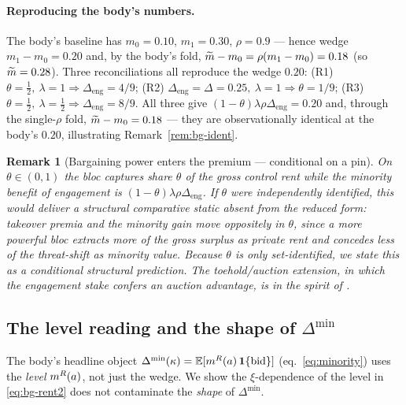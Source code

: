 \documentclass[11pt]{article}
\newcommand{\E}{\mathbb{E}}
\newcommand{\1}{\mathbf{1}}
\newtheorem{remark}{Remark}
\begin{document}
\paragraph{Reproducing the body's numbers.}
The body's baseline has $m_{0}=0.10$, $m_{1}=0.30$, $\rho=0.9$ --- hence wedge $m_{1}-m_{0}=0.20$ and, by the body's fold, $\widetilde{m}-m_{0}=\rho(m_{1}-m_{0})=0.18$ (so $\widetilde{m}=0.28$). Three reconciliations all reproduce the wedge $0.20$: (R1) $\theta=\tfrac12,\ \lambda=1\Rightarrow\Delta_{\mathrm{eng}}=4/9$; (R2) $\Delta_{\mathrm{eng}}=\Delta=0.25,\ \lambda=1\Rightarrow\theta=1/9$; (R3) $\theta=\tfrac12,\ \lambda=\tfrac12\Rightarrow\Delta_{\mathrm{eng}}=8/9$. All three give $(1-\theta)\lambda\rho\Delta_{\mathrm{eng}}=0.20$ and, through the single-$\rho$ fold, $\widetilde{m}-m_{0}=0.18$ --- they are observationally identical at the body's $0.20$, illustrating Remark~\ref{rem:bg-ident}.

\begin{remark}[Bargaining power enters the premium --- conditional on a pin]
\label{rem:bg-thetadomain}
On $\theta\in(0,1)$ the bloc captures share $\theta$ of the gross control rent while the minority benefit of engagement is $(1-\theta)\lambda\rho\Delta_{\mathrm{eng}}$. \emph{If $\theta$ were independently identified}, this would deliver a structural comparative static absent from the reduced form: takeover premia and the minority gain move oppositely in $\theta$, since a more powerful bloc extracts more of the gross surplus as private rent and concedes less of the threat-shift as minority value. Because $\theta$ is only set-identified, we state this as a conditional structural prediction. The toehold/auction extension, in which the engagement stake confers an auction advantage, is in the spirit of \citet{BulowHuangKlemperer1999}.
\end{remark}

\subsection{The level reading and the shape of \texorpdfstring{$\Delta^{\min}$}{Dmin}}
\label{app:bg-levels}

The body's headline object $\Delta^{\min}(\kappa)=\E[\mR(a)\,\1\{\textup{bid}\}]$ (eq.~\eqref{eq:minority}) uses the \emph{level} $m^{R}(a)$, not just the wedge. We show the $\xi$-dependence of the level in \eqref{eq:bg-rent2} does not contaminate the \emph{shape} of $\Delta^{\min}$.
\end{document}
